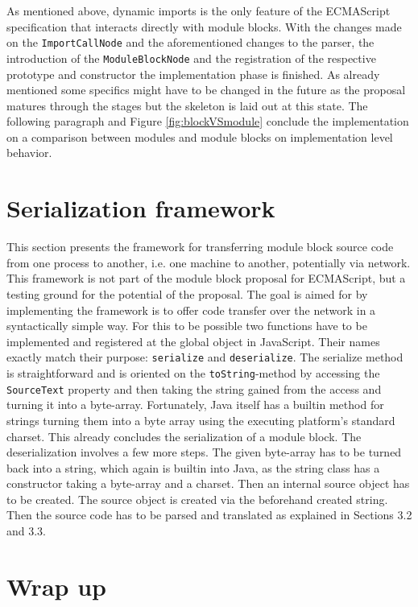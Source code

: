 As mentioned above, dynamic imports is the only feature of the ECMAScript specification that interacts directly with module blocks. With the changes made on the \texttt{ImportCallNode} and the aforementioned changes to the parser, the introduction of the \texttt{ModuleBlockNode} and the registration of the respective prototype and constructor the implementation phase is finished. As already mentioned some specifics might have to be changed in the future as the proposal matures through the stages but the skeleton is laid out at this state. The following paragraph and Figure \ref{fig:blockVSmodule} conclude the implementation on a comparison between modules and module blocks on implementation level behavior.

\section{Serialization framework}

This section presents the framework for transferring module block source code from one process to another, i.e. one machine to another, potentially via network. This framework is not part of the module block proposal for ECMAScript, but a testing ground for the potential of the proposal. The goal is aimed for by implementing the framework is to offer code transfer over the network in a syntactically simple way. For this to be possible two functions have to be implemented and registered at the global object in JavaScript. Their names exactly match their purpose: \texttt{serialize} and \texttt{deserialize}. The serialize method is straightforward and is oriented on the \texttt{toString}-method by accessing the \texttt{SourceText} property and then taking the string gained from the access and turning it into a byte-array. Fortunately, Java itself has a builtin method for strings turning them into a byte array using the executing platform's standard charset. This already concludes the serialization of a module block. The deserialization involves a few more steps. The given byte-array has to be turned back into a string, which again is builtin into Java, as the string class has a constructor taking a byte-array and a charset. Then an internal source object has to be created. The source object is created via the beforehand created string. Then the source code has to be parsed and translated as explained in Sections 3.2 and 3.3.

\section{Wrap up}

